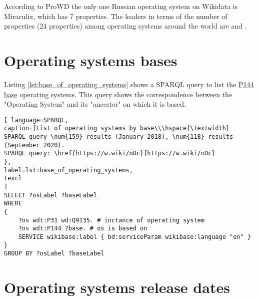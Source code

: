 According to ProWD the only one Russian operating system on Wikidata is Miraculix, which has 7 properties. The leaders in terms of the number of properties (24 properties) among operating systems around the world are  and .

\section{Operating systems bases}
Listing \ref{lst:base_of_operating_systems} shows a SPARQL query to list the \href{https://www.wikidata.org/wiki/Property_talk:P144}{P144 base} operating systems. This query shows the correspondence between the "Operating System" and its "ancestor" on which it is based.


\begin{lstlisting}[ language=SPARQL, 
caption={List of operating systems by base\\\hspace{\textwidth}
SPARQL query \num{159} results (January 2018), \num{118} results (September 2020).
SPARQL query: \href{https://w.wiki/nDc}{https://w.wiki/nDc}
},
label=lst:base_of_operating_systems,
texcl 
]
SELECT ?osLabel ?baseLabel
WHERE
{
	?os wdt:P31 wd:Q9135. # inctance of operating system
	?os wdt:P144 ?base. # os is based on 
	SERVICE wikibase:label { bd:serviceParam wikibase:language "en" }
}
GROUP BY ?osLabel ?baseLabel
\end{lstlisting}

\section{Operating systems release dates}

